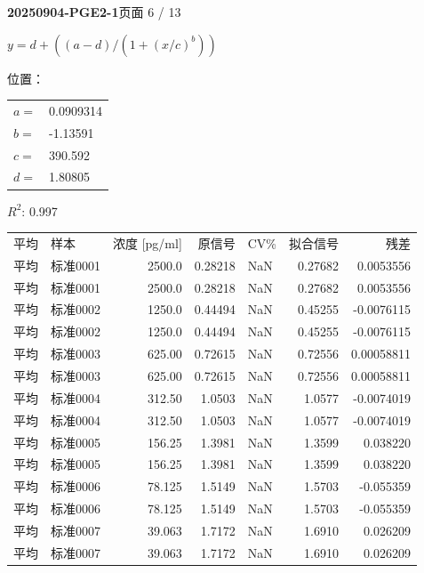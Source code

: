 \documentclass[UTF8,10pt,a4paper,fontset=fandol]{ctexart}
\begin{document}
\newpage

\noindent\textbf{20250904-PGE2-1}\hfill 页面 6 / 13

\noindent
$y = d + \left((a-d) / \left(1 + (x/c)^b\right)\right)$

\noindent
位置：

\begin{tabular}{@{}ll@{}}
$a =$ & 0.0909314 \\
$b =$ & -1.13591 \\
$c =$ & 390.592 \\
$d =$ & 1.80805 \\
\end{tabular}

\medskip

\noindent
$R^2$: 0.997

\medskip

\small
\begin{tabular}{@{}l l r r l r r@{}}
平均 & 样本 & 浓度 [pg/ml] & 原信号 & CV\% & 拟合信号 & 残差 \\
平均 & 标准0001 & 2500.0 & 0.28218 & NaN & 0.27682 & 0.0053556 \\
平均 & 标准0001 & 2500.0 & 0.28218 & NaN & 0.27682 & 0.0053556 \\
平均 & 标准0002 & 1250.0 & 0.44494 & NaN & 0.45255 & -0.0076115 \\
平均 & 标准0002 & 1250.0 & 0.44494 & NaN & 0.45255 & -0.0076115 \\
平均 & 标准0003 & 625.00 & 0.72615 & NaN & 0.72556 & 0.00058811 \\
平均 & 标准0003 & 625.00 & 0.72615 & NaN & 0.72556 & 0.00058811 \\
平均 & 标准0004 & 312.50 & 1.0503 & NaN & 1.0577 & -0.0074019 \\
平均 & 标准0004 & 312.50 & 1.0503 & NaN & 1.0577 & -0.0074019 \\
平均 & 标准0005 & 156.25 & 1.3981 & NaN & 1.3599 & 0.038220 \\
平均 & 标准0005 & 156.25 & 1.3981 & NaN & 1.3599 & 0.038220 \\
平均 & 标准0006 & 78.125 & 1.5149 & NaN & 1.5703 & -0.055359 \\
平均 & 标准0006 & 78.125 & 1.5149 & NaN & 1.5703 & -0.055359 \\
平均 & 标准0007 & 39.063 & 1.7172 & NaN & 1.6910 & 0.026209 \\
平均 & 标准0007 & 39.063 & 1.7172 & NaN & 1.6910 & 0.026209 \\
\end{tabular}
\normalsize
\end{document}
